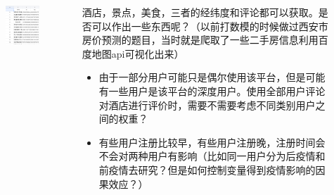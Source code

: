 \documentclass[10pt]{beamer}
\begin{document}
\begin{frame}
    \begin{columns}
        \begin{column}{0.5\textwidth}
            \begin{figure}
                \includegraphics[width=1\textwidth]{figures/酒店经纬度.png}
            \end{figure}
        \end{column}
        \begin{column}{0.5\textwidth}
            酒店，景点，美食，三者的经纬度和评论都可以获取。是否可以作出一些东西呢？{\color{red}（以前打数模的时候做过西安市房价预测的题目，当时就是爬取了一些二手房信息利用百度地图api可视化出来）}
            \begin{itemize}
                \item 由于一部分用户可能只是偶尔使用该平台，但是可能有一些用户是该平台的深度用户。使用全部用户评论对酒店进行评价时，需要不需要考虑不同类别用户之间的权重？
                \item 有些用户注册比较早，有些用户注册晚，注册时间会不会对两种用户有影响（比如同一用户分为后疫情和前疫情去研究？但是如何控制变量得到疫情影响的因果效应？）
            \end{itemize}
        \end{column}
    \end{columns}
\end{frame}
\end{document}
